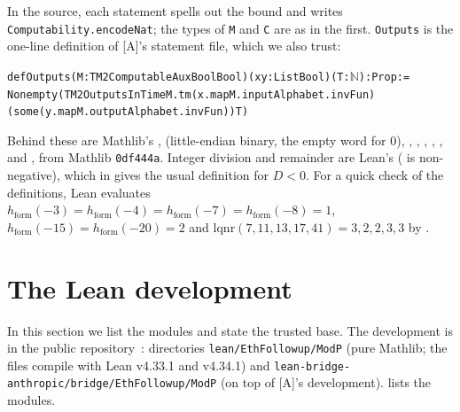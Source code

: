 \documentclass[10pt]{amsart}
\theoremstyle{plain}
\theoremstyle{definition}
\theoremstyle{remark}
\numberwithin{equation}{section}
\newcommand{\A}{\textup{[A]}}
\newcommand{\hF}{h_{\mathrm{form}}}
\begin{document}
In the source, each statement spells out the bound and writes \texttt{Computability.encodeNat}; the
types of \texttt{M} and \texttt{C} are as in the first. \texttt{Outputs} is the one-line definition of \A's
statement file, which we also trust:
\begin{alltt}\footnotesize
def Outputs (M : TM2ComputableAux Bool Bool) (x y : List Bool) (T : \(\mathbb{N}\)) : Prop :=
  Nonempty (TM2OutputsInTime M.tm (x.map M.inputAlphabet.invFun)
    (some (y.map M.outputAlphabet.invFun)) T)
\end{alltt}
Behind these are Mathlib's ,  (little-endian
binary, the empty word for $0$), , , ,
, ,  and , from Mathlib \texttt{0df444a}.
Integer division and remainder are Lean's ( is non-negative), which in 
gives the usual definition for $D<0$. For a quick check of the definitions, Lean evaluates
$\hF(-3)=\hF(-4)=\hF(-7)=\hF(-8)=1$, $\hF(-15)=\hF(-20)=2$ and $\mathrm{lqnr}(7,11,13,17,41)=3,2,2,3,3$ by
.

\section{The Lean development}\label{sec:formal}

In this section we list the modules and state the trusted base. The development is in the public
repository~\cite{TulsyanRepo26}: directories \texttt{lean/EthFollowup/ModP} (pure Mathlib; the files
compile with Lean v4.33.1 and v4.34.1) and \texttt{lean-bridge-anthropic/bridge/EthFollowup/ModP} (on top
of \A's development).  lists the modules.
\end{document}
